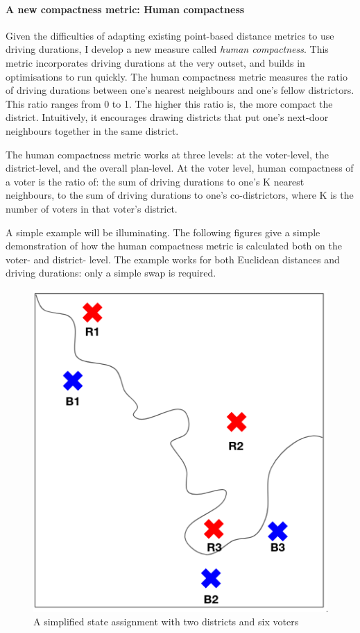 \documentclass[]{article}
\let\oldparagraph\paragraph
\renewcommand{\paragraph}[1]{\oldparagraph{#1}\mbox{}}
\begin{document}
\hypertarget{a-new-compactness-metric-human-compactness}{%
\paragraph{A new compactness metric: Human
compactness}\label{a-new-compactness-metric-human-compactness}}

Given the difficulties of adapting existing point-based distance metrics
to use driving durations, I develop a new measure called \emph{human
compactness}. This metric incorporates driving durations at the very
outset, and builds in optimisations to run quickly. The human
compactness metric measures the ratio of driving durations between one's
nearest neighbours and one's fellow districtors. This ratio ranges from
0 to 1. The higher this ratio is, the more compact the district.
Intuitively, it encourages drawing districts that put one's next-door
neighbours together in the same district.

The human compactness metric works at three levels: at the voter-level,
the district-level, and the overall plan-level. At the voter level,
human compactness of a voter is the ratio of: the sum of driving
durations to one's K nearest neighbours, to the sum of driving durations
to one's co-districtors, where K is the number of voters in that voter's
district.

A simple example will be illuminating. The following figures give a
simple demonstration of how the human compactness metric is calculated
both on the voter- and district- level. The example works for both
Euclidean distances and driving durations: only a simple swap is
required.

\begin{figure}
\centering
\includegraphics{img/human_compactness_1.png}
\caption{A simplified state assignment with two districts and six voters
\label{hc_demo}}
\end{figure}
\end{document}
